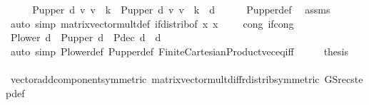 \begin{isabellebody}
\ \ \isamarkupfalse%
\ \isamarkupfalse%
\ {\isachardoublequoteopen}{\isacharparenleft}{\kern0pt}P{\isacharunderscore}{\kern0pt}upper\ d\ {\isacharasterisk}{\kern0pt}v\ v{\isacharparenright}{\kern0pt}\ {\isachardollar}{\kern0pt}\ k\ {\isacharequal}{\kern0pt}\ {\isacharparenleft}{\kern0pt}P{\isacharunderscore}{\kern0pt}upper\ d\ {\isacharasterisk}{\kern0pt}v\ v{\isacharprime}{\kern0pt}{\isacharparenright}{\kern0pt}\ {\isachardollar}{\kern0pt}\ k{\isachardoublequoteclose}\ \ d\isanewline
\ \ \ \ \isamarkupfalse%
\ P{\isacharunderscore}{\kern0pt}upper{\isacharunderscore}{\kern0pt}def\ \isamarkupfalse%
\ assms\isanewline
\ \ \ \ \isamarkupfalse%
\ {\isacharparenleft}{\kern0pt}auto\ simp{\isacharcolon}{\kern0pt}\ matrix{\isacharunderscore}{\kern0pt}vector{\isacharunderscore}{\kern0pt}mult{\isacharunderscore}{\kern0pt}def\ if{\isacharunderscore}{\kern0pt}distrib{\isacharbrackleft}{\kern0pt}of\ {\isachardoublequoteopen}{\isasymlambda}x{\isachardot}{\kern0pt}\ x\ {\isacharasterisk}{\kern0pt}\ {\isacharunderscore}{\kern0pt}\ {\isachardollar}{\kern0pt}\ {\isacharunderscore}{\kern0pt}{\isachardoublequoteclose}{\isacharbrackright}{\kern0pt}\ cong{\isacharcolon}{\kern0pt}\ if{\isacharunderscore}{\kern0pt}cong{\isacharparenright}{\kern0pt}\isanewline
\ \ \isamarkupfalse%
\ \isamarkupfalse%
\ {\isachardoublequoteopen}P{\isacharunderscore}{\kern0pt}lower\ d\ {\isacharplus}{\kern0pt}\ P{\isacharunderscore}{\kern0pt}upper\ d\ {\isacharequal}{\kern0pt}\ P{\isacharunderscore}{\kern0pt}dec\ d{\isachardoublequoteclose}\ \ d\isanewline
\ \ \ \ \isamarkupfalse%
\ {\isacharparenleft}{\kern0pt}auto\ simp{\isacharcolon}{\kern0pt}\ P{\isacharunderscore}{\kern0pt}lower{\isacharunderscore}{\kern0pt}def\ P{\isacharunderscore}{\kern0pt}upper{\isacharunderscore}{\kern0pt}def\ Finite{\isacharunderscore}{\kern0pt}Cartesian{\isacharunderscore}{\kern0pt}Product{\isachardot}{\kern0pt}vec{\isacharunderscore}{\kern0pt}eq{\isacharunderscore}{\kern0pt}iff{\isacharparenright}{\kern0pt}\isanewline
\ \ \isamarkupfalse%
\ \isamarkupfalse%
\ {\isacharquery}{\kern0pt}thesis\isanewline
\ \ \ \ \isamarkupfalse%
\ vector{\isacharunderscore}{\kern0pt}add{\isacharunderscore}{\kern0pt}component{\isacharbrackleft}{\kern0pt}symmetric{\isacharbrackright}{\kern0pt}\ matrix{\isacharunderscore}{\kern0pt}vector{\isacharunderscore}{\kern0pt}mult{\isacharunderscore}{\kern0pt}diff{\isacharunderscore}{\kern0pt}rdistrib{\isacharbrackleft}{\kern0pt}symmetric{\isacharbrackright}{\kern0pt}\ GS{\isacharunderscore}{\kern0pt}rec{\isacharunderscore}{\kern0pt}step{\isacharunderscore}{\kern0pt}def\isanewline

\end{isabellebody}
